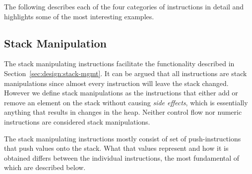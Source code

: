 
The following describes each of the four categories of instructions in detail
and highlights some of the most interesting examples.

\subsection{Stack Manipulation}

The stack manipulating instructions facilitate the functionality described in
Section~\ref{sec:design:stack-mgmt}. It can be argued that all instructions are
stack manipulations since almost every instruction will leave the stack
changed. However we define stack manipulations as the instructions that either
add or remove an element on the stack without causing \textit{side effects},
which is essentially anything that results in changes in the heap. Neither
control flow nor numeric instructions are considered stack manipulations.

The stack manipulating instructions mostly consist of set of push-instructions
that push values onto the stack. What that values represent and how it is
obtained differs between the individual instructions, the most fundamental of
which are described below.

